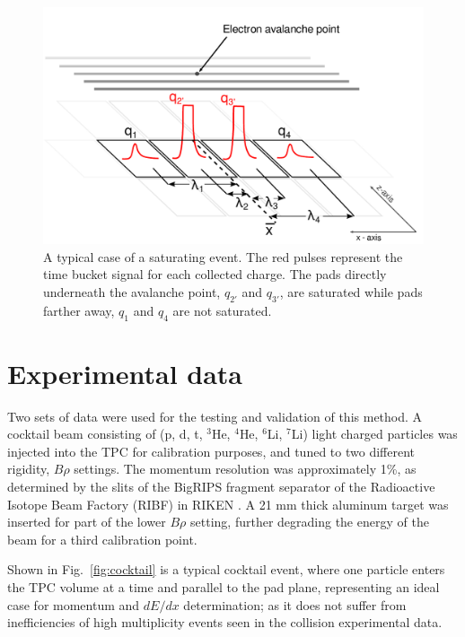 \documentclass[review]{elsarticle}
\begin{document}
\begin{figure}[ht!]
\includegraphics[width=\linewidth]{saturated_pads}
\caption{A typical case of a saturating event. The red pulses represent the time bucket signal for each collected charge. The pads directly underneath the avalanche point, $q_{2'}$ and $q_{3'}$, are saturated while pads farther away, $q_1$ and $q_4$ are not saturated.}
\label{fig:satpad}
\end{figure}

\section{Experimental data}
Two sets of data were used for the testing and validation of this method. A cocktail beam consisting of (p, d, t, ${}^3$He, ${}^4$He, ${}^6$Li, ${}^7$Li) light charged particles was injected into the TPC for calibration purposes, and tuned to two different rigidity, $B\rho$ settings. The momentum resolution was approximately 1\%, as determined by the slits of the BigRIPS fragment separator of the Radioactive Isotope Beam Factory (RIBF) in RIKEN \cite{bigrips}. A 21 mm thick aluminum target was inserted for part of the lower $B\rho$ setting, further degrading the energy of the beam for a third calibration point. 

Shown in Fig.~\ref{fig:cocktail} is a typical cocktail event, where one particle enters the TPC volume at a time and parallel to the pad plane, representing an ideal case for momentum and $dE/dx$ determination; as it does not suffer from inefficiencies of high multiplicity events seen in the collision experimental data.  
\end{document}
